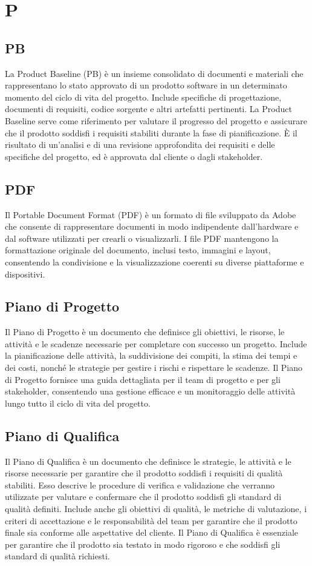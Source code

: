 \section{P} 
\subsection{PB} 
La Product Baseline (PB) è un insieme consolidato di documenti e materiali che rappresentano lo stato approvato di un prodotto software in un determinato momento del ciclo di vita del progetto. Include specifiche di progettazione, documenti di requisiti, codice sorgente e altri artefatti pertinenti. La Product Baseline serve come riferimento per valutare il progresso del progetto e assicurare che il prodotto soddisfi i requisiti stabiliti durante la fase di pianificazione. È il risultato di un'analisi e di una revisione approfondita dei requisiti e delle specifiche del progetto, ed è approvata dal cliente o dagli stakeholder.
\subsection{PDF} 
Il Portable Document Format (PDF) è un formato di file sviluppato da Adobe che consente di rappresentare documenti in modo indipendente dall'hardware e dal software utilizzati per crearli o visualizzarli. I file PDF mantengono la formattazione originale del documento, inclusi testo, immagini e layout, consentendo la condivisione e la visualizzazione coerenti su diverse piattaforme e dispositivi. 
\subsection{Piano di Progetto} 
Il Piano di Progetto è un documento che definisce gli obiettivi, le risorse, le attività e le scadenze necessarie per completare con successo un progetto. Include la pianificazione delle attività, la suddivisione dei compiti, la stima dei tempi e dei costi, nonché le strategie per gestire i rischi e rispettare le scadenze. Il Piano di Progetto fornisce una guida dettagliata per il team di progetto e per gli stakeholder, consentendo una gestione efficace e un monitoraggio delle attività lungo tutto il ciclo di vita del progetto. 
\subsection{Piano di Qualifica} 
Il Piano di Qualifica è un documento che definisce le strategie, le attività e le risorse necessarie per garantire che il prodotto soddisfi i requisiti di qualità stabiliti. Esso descrive le procedure di verifica e validazione che verranno utilizzate per valutare e confermare che il prodotto soddisfi gli standard di qualità definiti. Include anche gli obiettivi di qualità, le metriche di valutazione, i criteri di accettazione e le responsabilità del team per garantire che il prodotto finale sia conforme alle aspettative del cliente. Il Piano di Qualifica è essenziale per garantire che il prodotto sia testato in modo rigoroso e che soddisfi gli standard di qualità richiesti. 
